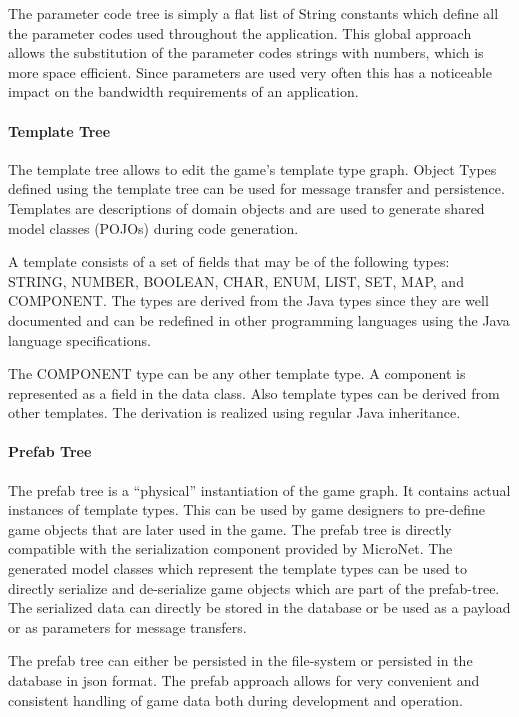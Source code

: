 The parameter code tree is simply a flat list of String constants which define
all the parameter codes used throughout the application. This global approach
allows the substitution of the parameter codes strings with numbers, which is
more space efficient. Since parameters are used very often this has a noticeable
impact on the bandwidth requirements of an application.

\paragraph{Template Tree}

The template tree allows to edit the game's template type graph. Object Types
defined using the template tree can be used for message transfer and
persistence. Templates are descriptions of domain objects and are used to
generate shared model classes (POJOs) during code generation.

A template consists of a set of fields that may be of the following types:
STRING, NUMBER, BOOLEAN, CHAR, ENUM, LIST, SET, MAP, and COMPONENT. The types
are derived from the Java types since they are well documented and can be
redefined in other programming languages using the Java language specifications.

The COMPONENT type can be any other template type. A component is represented as
a field in the data class. Also template types can be derived from
other templates. The derivation is realized using regular Java inheritance.


\paragraph{Prefab Tree}

The prefab tree is a ``physical'' instantiation of the game graph. It contains
actual instances of template types. This can be used by game designers to
pre-define game objects that are later used in the game. The prefab tree is
directly compatible with the serialization component provided by MicroNet. The
generated model classes which represent the template types can be used to
directly serialize and de-serialize game objects which are part of the
prefab-tree. The serialized data can directly be stored in the database or
be used as a payload or as parameters for message transfers.

The prefab tree can either be persisted in the file-system or persisted in the
database in \gls{json} format. The prefab approach allows for very convenient and
consistent handling of game data both during development and operation.


